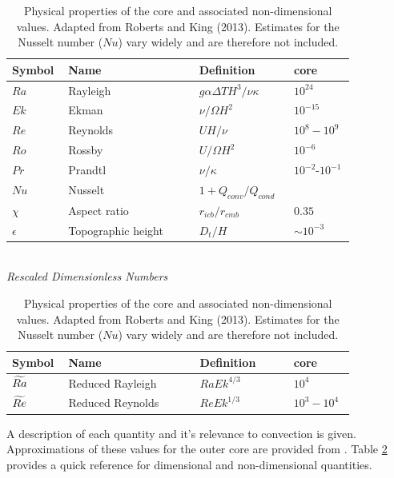 \begin{table}
\begin{center}
\begin{tabular}{|p{0.1\linewidth} p{0.35\linewidth} p{0.25\linewidth} p{0.15\linewidth}|}
\hline
Symbol & Name&Definition & core\\
\hline
$Ra$&Rayleigh&$g\alpha\Delta TH^{3}/\nu\kappa$ & $10^{24}$\\
$Ek$&Ekman&$\nu/\Omega H^{2}$ & $10^{-15}$\\
$Re$&Reynolds&$UH/\nu$ & $10^{8}-10^{9}$\\
$Ro$&Rossby&$U/\Omega H^{2}$ & $10^{-6}$\\
$Pr$ & Prandtl&$\nu/\kappa$&$10^{-2}$-$10^{-1}$ \\
$Nu$ & Nusselt& $ 1 +Q_{conv}/Q_{cond}$ &\\
$\chi$ & Aspect ratio & $r_{icb}/r _{cmb}$ &$0.35$\\
$\epsilon$ & Topographic height &$D_{t}/H$&$\sim10^{-3}$\\
 \hline
\end{tabular}
\vspace{1mm}\\
\textit{Rescaled Dimensionless Numbers}\\
\vspace{1mm}
\begin{tabular}{|p{0.1\linewidth} p{0.35\linewidth} p{0.25\linewidth} p{0.15\linewidth}|}
	
\hline
Symbol & Name&Definition&core\\
\hline
$\widetilde{Ra}$&Reduced Rayleigh&$Ra Ek^{4/3}$ & $10^{4}$\\
$\widetilde{Re} $& Reduced Reynolds& $ReEk^{1/3}$ &$10^{3}-10^{4}$\\
 \hline
\end{tabular}
\caption[Core parameters]{Physical properties of the core and associated non-dimensional values. Adapted from Roberts and King (2013)\citep{pR13}. Estimates for the Nusselt number ($Nu$) vary widely and are therefore not included.}
\label{at:param}
\end{center}
\end{table}

A description of each quantity and it's relevance to convection is given. Approximations of these values for the outer core are provided from \citep{pR13}. 
Table \ref{at:param} provides a quick reference for dimensional and non-dimensional quantities.

\noindent
